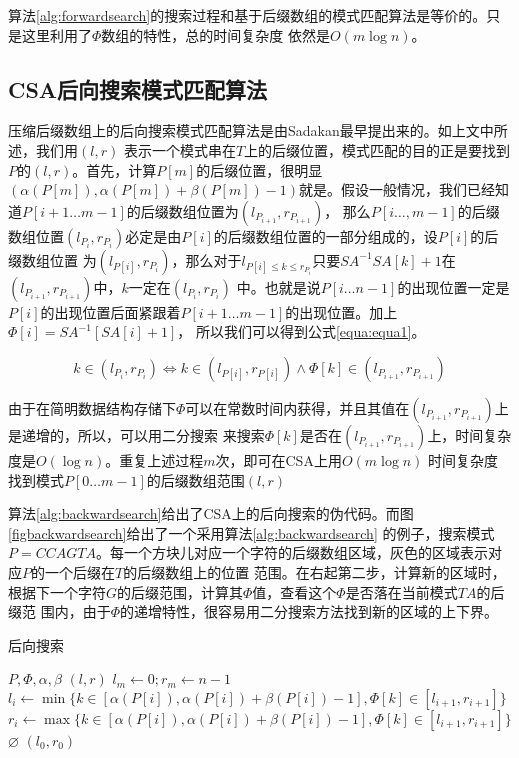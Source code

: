 算法\ref{alg:forwardsearch}的搜索过程和基于后缀数组的模式匹配算法是等价的。只是这里利用了$\Phi$数组的特性，总的时间复杂度
依然是$O(m\log n)$。

\subsection{CSA后向搜索模式匹配算法}
压缩后缀数组上的后向搜索模式匹配算法是由Sadakan最早提出来的\cite{sadakane2002succinct}。如上文中所述，我们用$(l,r)$
表示一个模式串在$T$上的后缀位置，模式匹配的目的正是要找到$P$的$(l,r)$。首先，计算$P[m]$的后缀位置，很明显$(\alpha(P[m]),
\alpha(P[m])+\beta(P[m])-1)$就是。假设一般情况，我们已经知道$P[i+1\ldots m-1]$的后缀数组位置为$(l_{P_{i+1}},r_{P_{i+1}})$，
那么$P[i\ldots,m-1]$的后缀数组位置$(l_{P_i},r_{P_i})$必定是由$P[i]$的后缀数组位置的一部分组成的，设$P[i]$的后缀数组位置
为$(l_{P[i]},r_{P_i})$，那么对于$l_{P[i]\leq k \leq r_{P_i}}$只要$SA^{-1}SA[k]+1$在$(l_{P_{i+1}},r_{P_{i+1}})$中，$k$一定在$(l_{P_i},r_{P_i})$
中。也就是说$P[i\ldots n-1]$的出现位置一定是$P[i]$的出现位置后面紧跟着$P[i+1\ldots m-1]$的出现位置。加上$\Phi[i]=SA^{-1}[SA[i]+1]$，
所以我们可以得到公式\ref{equa:equa1}。

\begin{equation}\label{equa:equa1}
    k \in (l_{P_i},r_{P_i}) \iff k \in (l_{P[i]},r_{P[i]}) \wedge \Phi[k] \in (l_{P_{i+1}},r_{P_{i+1}})
\end{equation}

由于在简明数据结构存储下$\Phi$可以在常数时间内获得，并且其值在$(l_{P_{i+1}},r_{P_{i+1}})$上是递增的，所以，可以用二分搜索
来搜索$\Phi[k]$是否在$(l_{P_{i+1}},r_{P_{i+1}})$上，时间复杂度是$O(\log n)$。重复上述过程$m$次，即可在CSA上用$O(m\log n)$
时间复杂度找到模式$P[0\ldots m-1]$的后缀数组范围$(l,r)$

算法\ref{alg:backwardsearch}给出了CSA上的后向搜索的伪代码。而图\ref{figbackwardsearch}给出了一个采用算法\ref{alg:backwardsearch}
的例子，搜索模式$P=CCAGTA$。每一个方块儿对应一个字符的后缀数组区域，灰色的区域表示对应$P$的一个后缀在$T$的后缀数组上的位置
范围。在右起第二步，计算新的区域时，根据下一个字符$G$的后缀范围，计算其$\Phi$值，查看这个$\Phi$是否落在当前模式$TA$的后缀范
围内，由于$\Phi$的递增特性，很容易用二分搜索方法找到新的区域的上下界。

\begin{algorithm}
    \caption{后向搜索}
    \label{alg:backwardsearch}
    \begin{algorithmic}[1]
        \Require $P,\Phi,\alpha,\beta$
        \Ensure $(l,r)$
        \State $l_{m} \gets 0;r_{m}\gets n-1$
            \State $l_i \gets \min\{ k \in [\alpha(P[i]),\alpha(P[i])+\beta(P[i])-1],\Phi[k] \in [l_{i+1},r_{i+1}]\}$
            \State $r_i \gets \max\{ k \in [\alpha(P[i]),\alpha(P[i])+\beta(P[i])-1],\Phi[k] \in [l_{i+1},r_{i+1}]\}$
                \State \Return $\varnothing$
            \EndIf
        \EndFor
        \State \Return $(l_0,r_0)$
        \EndFunction
    \end{algorithmic}
\end{algorithm}



